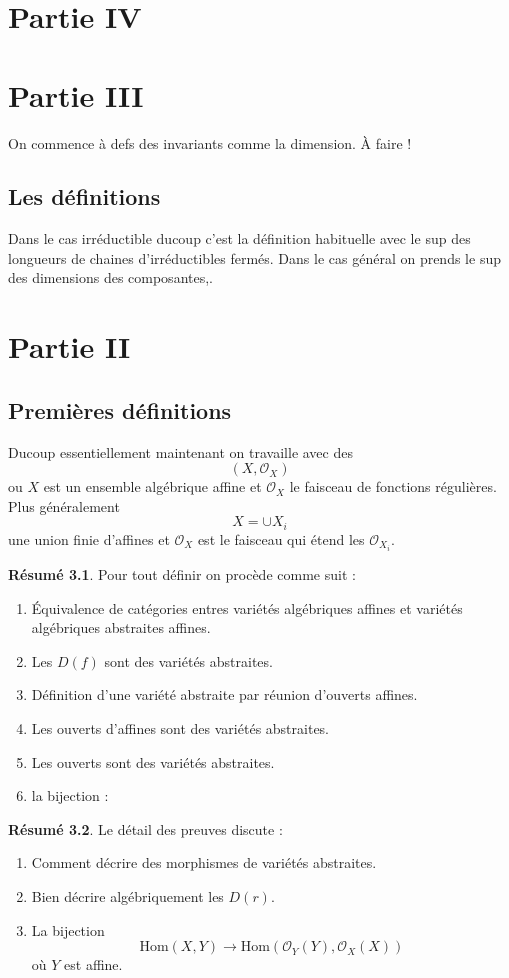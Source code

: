 \documentclass[a4paper,12pt]{book}
\newcommand{\Or}{\mathcal{O}}
\newcommand{\Hom}{\textrm{Hom}}
\theoremstyle{plain}
\theoremstyle{definition}
\newtheorem{res}{Résumé}
\theoremstyle{remark}
\begin{document}
\chapter{Partie IV}

\chapter{Partie III}
On commence à defs des invariants comme la dimension. À faire !

\section{Les définitions}
Dans le cas irréductible ducoup c'est la définition habituelle avec 
le sup des longueurs de chaines d'irréductibles fermés. Dans le cas 
général on prends le sup des dimensions des composantes,. 

\chapter{Partie II}
\section{Premières définitions}
Ducoup essentiellement maintenant on travaille avec des 
\[(X,\Or_X)\]
ou $X$ est un ensemble algébrique affine et $\Or_X$ le faisceau de
fonctions régulières. Plus généralement
\[X=\cup X_i\]
une union finie d'affines et $\Or_X$ est le faisceau qui étend les 
$\Or_{X_i}$.
\begin{res}
 Pour tout définir on procède comme suit :
    \begin{enumerate}
	\item Équivalence de catégories entres variétés algébriques affines
	    et variétés algébriques abstraites affines.
	\item Les $D(f)$ sont des variétés abstraites.
	\item Définition d'une variété abstraite par réunion d'ouverts 
	    affines.
	\item Les ouverts d'affines sont des variétés abstraites.
	\item Les ouverts sont des variétés abstraites.
	\item la bijection :
    \end{enumerate}
\end{res}
\begin{res}
Le détail des preuves discute :
    \begin{enumerate}
	\item Comment décrire des morphismes de variétés abstraites.
	\item Bien décrire algébriquement les $D(r)$.
	\item La bijection
	    \[\Hom(X,Y)\to \Hom(\Or_Y(Y),\Or_X(X))\]
	    où $Y$ est affine.
    \end{enumerate}
\end{res}
\end{document}
